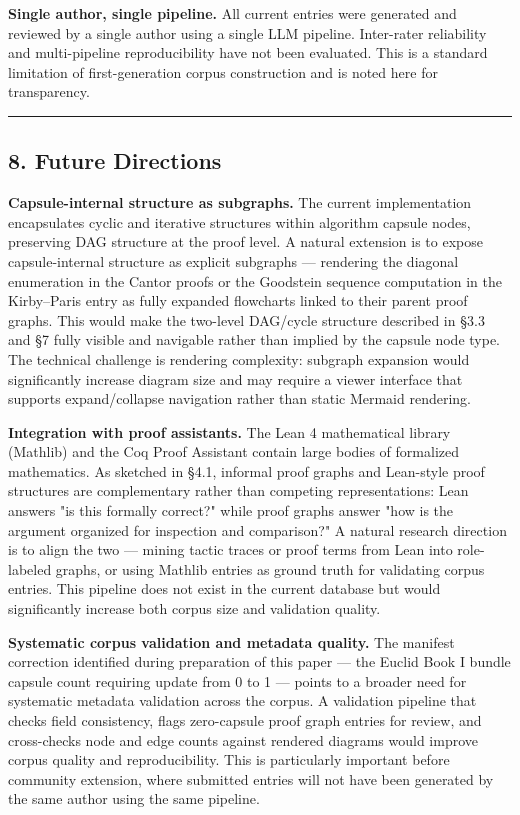\documentclass[
  11pt]{article}
\begin{document}
\textbf{Single author, single pipeline.} All current entries were
generated and reviewed by a single author using a single LLM pipeline.
Inter-rater reliability and multi-pipeline reproducibility have not been
evaluated. This is a standard limitation of first-generation corpus
construction and is noted here for transparency.

\begin{center}\rule{0.5\linewidth}{0.5pt}\end{center}

\hypertarget{8-future-directions}{%
\subsection{8. Future Directions}\label{8-future-directions}}

\textbf{Capsule-internal structure as subgraphs.} The current
implementation encapsulates cyclic and iterative structures within
algorithm capsule nodes, preserving DAG structure at the proof level. A
natural extension is to expose capsule-internal structure as explicit
subgraphs --- rendering the diagonal enumeration in the Cantor proofs or
the Goodstein sequence computation in the Kirby--Paris entry as fully
expanded flowcharts linked to their parent proof graphs. This would make
the two-level DAG/cycle structure described in §3.3 and §7 fully visible
and navigable rather than implied by the capsule node type. The
technical challenge is rendering complexity: subgraph expansion would
significantly increase diagram size and may require a viewer interface
that supports expand/collapse navigation rather than static Mermaid
rendering.

\textbf{Integration with proof assistants.} The Lean 4 mathematical
library (Mathlib) and the Coq Proof Assistant contain large bodies of
formalized mathematics. As sketched in §4.1, informal proof graphs and
Lean-style proof structures are complementary rather than competing
representations: Lean answers "is this formally correct?" while proof
graphs answer "how is the argument organized for inspection and
comparison?" A natural research direction is to align the two --- mining
tactic traces or proof terms from Lean into role-labeled graphs, or
using Mathlib entries as ground truth for validating corpus entries.
This pipeline does not exist in the current database but would
significantly increase both corpus size and validation quality.

\textbf{Systematic corpus validation and metadata quality.} The manifest
correction identified during preparation of this paper --- the Euclid
Book I bundle capsule count requiring update from 0 to 1 --- points to a
broader need for systematic metadata validation across the corpus. A
validation pipeline that checks field consistency, flags zero-capsule
proof graph entries for review, and cross-checks node and edge counts
against rendered diagrams would improve corpus quality and
reproducibility. This is particularly important before community
extension, where submitted entries will not have been generated by the
same author using the same pipeline.
\end{document}
